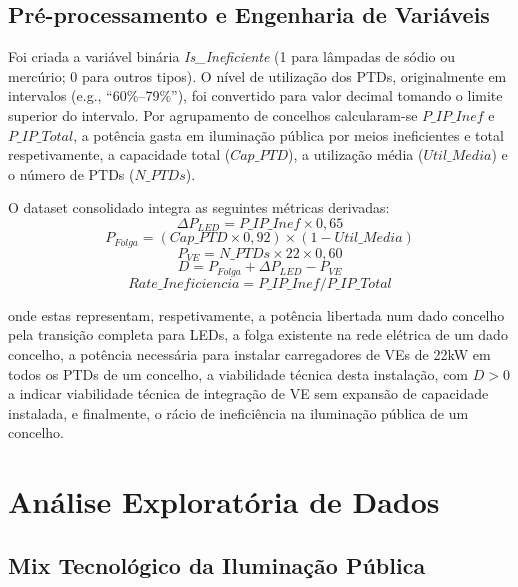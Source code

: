 \documentclass[conference]{IEEEtran}
\begin{document}
\subsection{Pré-processamento e Engenharia de Variáveis}

Foi criada a variável binária \textit{Is\_Ineficiente} (1 para lâmpadas de sódio ou mercúrio; 0 para outros tipos). O nível de utilização dos PTDs, originalmente em intervalos (e.g., ``60\%--79\%''), foi convertido para valor decimal tomando o limite superior do intervalo. Por agrupamento de concelhos calcularam-se $P\_IP\_Inef$ e $P\_IP\_Total$, a potência gasta em iluminação pública por meios ineficientes e total respetivamente, a capacidade total ($Cap\_PTD$), a utilização média ($Util\_Media$) e o número de PTDs ($N\_PTDs$).

O dataset consolidado integra as seguintes métricas derivadas:
\begin{equation}
\Delta P_{LED} = P\_IP\_Inef \times 0{,}65
\end{equation}
\begin{equation}
P_{Folga} = (Cap\_PTD \times 0{,}92) \times (1 - Util\_Media)
\end{equation}
\begin{equation}
P_{VE} = N\_PTDs \times 22 \times 0{,}60
\end{equation}
\begin{equation}
D = P_{Folga} + \Delta P_{LED} - P_{VE}
\end{equation}
\begin{equation}
Rate\_Ineficiencia = P\_IP\_Inef / P\_IP\_Total
\end{equation}

onde estas representam, respetivamente, a potência libertada num dado concelho pela transição completa para LEDs, a folga existente na rede elétrica de um dado concelho, a potência necessária para instalar carregadores de VEs de 22kW em todos os PTDs de um concelho, a viabilidade técnica desta instalação, com $D > 0$ a indicar viabilidade técnica de integração de VE sem expansão de capacidade instalada, e finalmente, o rácio de ineficiência na iluminação pública de um concelho.


\section{Análise Exploratória de Dados}

\subsection{Mix Tecnológico da Iluminação Pública}
\end{document}
